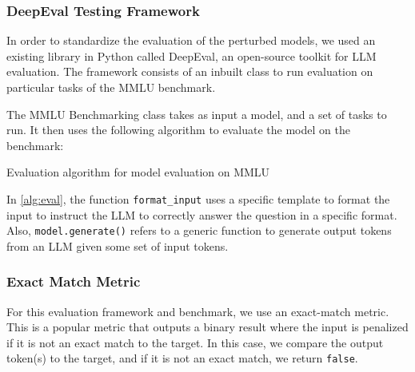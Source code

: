 \subsubsection{DeepEval Testing Framework}
In order to standardize the evaluation of the perturbed models, we used an existing library in Python called DeepEval, an open-source toolkit for LLM evaluation. The framework consists of an inbuilt class to run evaluation on particular tasks of the MMLU benchmark. 

The MMLU Benchmarking class takes as input a model, and a set of tasks to run. It then uses the following algorithm to evaluate the model on the benchmark:

\begin{algorithm}
    \caption{Evaluation algorithm for model evaluation on MMLU}
    \label{alg:eval}
    \SetAlgoLined
\end{algorithm}
In \ref{alg:eval}, the function \verb|format_input| uses a specific template to format the input to instruct the LLM to correctly answer the question in a specific format. Also, \verb|model.generate()| refers to a generic function to generate output tokens from an LLM given some set of input tokens. 

\subsubsection{Exact Match Metric}
For this evaluation framework and benchmark, we use an exact-match metric. This is a popular metric that outputs a binary result where the input is penalized if it is not an exact match to the target. In this case, we compare the output token(s) to the target, and if it is not an exact match, we return \verb|false|.

\pagebreak 

